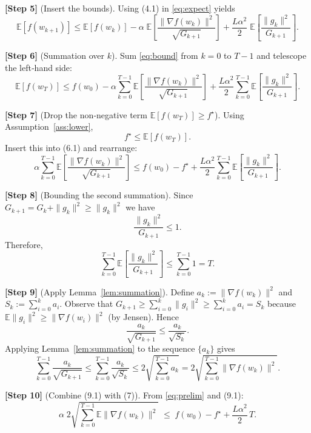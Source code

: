\documentclass{article}
\begin{document}
\noindent\textbf{[Step 5]} (Insert the bounds).  
Using (4.1) in \eqref{eq:expect} yields
\begin{equation}
\mathbb{E}[f(w_{k+1})]\le
\mathbb{E}[f(w_k)]-
\alpha\;\mathbb{E}\!\left[\frac{\|\nabla f(w_k)\|^{2}}{\sqrt{G_{k+1}}}\right]
+\frac{L\alpha^{2}}{2}\;
\mathbb{E}\!\left[\frac{\|g_k\|^{2}}{G_{k+1}}\right].
\label{eq:bound}
\end{equation}

\noindent\textbf{[Step 6]} (Summation over $k$).  
Sum \eqref{eq:bound} from $k=0$ to $T-1$ and telescope the left‑hand side:
\[
\mathbb{E}[f(w_T)]\le f(w_0)
-\alpha\sum_{k=0}^{T-1}\mathbb{E}\!\left[\frac{\|\nabla f(w_k)\|^{2}}{\sqrt{G_{k+1}}}\right]
+\frac{L\alpha^{2}}{2}\sum_{k=0}^{T-1}
\mathbb{E}\!\left[\frac{\|g_k\|^{2}}{G_{k+1}}\right].
\tag{6.1}
\]

\noindent\textbf{[Step 7]} (Drop the non‑negative term $\mathbb{E}[f(w_T)]\ge f^{\star}$).  
Using Assumption~\ref{ass:lower},
\[
f^{\star}\le\mathbb{E}[f(w_T)] .
\]
Insert this into (6.1) and rearrange:
\begin{equation}
\alpha\sum_{k=0}^{T-1}\mathbb{E}\!\left[\frac{\|\nabla f(w_k)\|^{2}}{\sqrt{G_{k+1}}}\right]
\le f(w_0)-f^{\star}
+\frac{L\alpha^{2}}{2}\sum_{k=0}^{T-1}
\mathbb{E}\!\left[\frac{\|g_k\|^{2}}{G_{k+1}}\right].
\label{eq:prelim}
\end{equation}

\noindent\textbf{[Step 8]} (Bounding the second summation).  
Since $G_{k+1}=G_k+\|g_k\|^{2}\ge \|g_k\|^{2}$ we have
\[
\frac{\|g_k\|^{2}}{G_{k+1}}\le 1 .
\]
Therefore,
\[
\sum_{k=0}^{T-1}\mathbb{E}\!\left[\frac{\|g_k\|^{2}}{G_{k+1}}\right]
\le \sum_{k=0}^{T-1}1 = T .
\tag{8.1}
\]

\noindent\textbf{[Step 9]} (Apply Lemma~\ref{lem:summation}).  
Define $a_k:=\|\nabla f(w_k)\|^{2}$ and $S_k:=\sum_{i=0}^{k} a_i$.
Observe that $G_{k+1}\ge \sum_{i=0}^{k}\|g_i\|^{2}\ge\sum_{i=0}^{k}a_i=S_k$ because $\mathbb{E}\|g_i\|^{2}\ge\|\nabla f(w_i)\|^{2}$ (by Jensen). Hence
\[
\frac{a_k}{\sqrt{G_{k+1}}}\le\frac{a_k}{\sqrt{S_k}} .
\]
Applying Lemma~\ref{lem:summation} to the sequence $\{a_k\}$ gives
\[
\sum_{k=0}^{T-1}\frac{a_k}{\sqrt{G_{k+1}}}
\le
\sum_{k=0}^{T-1}\frac{a_k}{\sqrt{S_k}}
\le 2\sqrt{\sum_{k=0}^{T-1}a_k}
=2\sqrt{\sum_{k=0}^{T-1}\|\nabla f(w_k)\|^{2}} .
\tag{9.1}
\]

\noindent\textbf{[Step 10]} (Combine (9.1) with (7)).  
From \eqref{eq:prelim} and (9.1):
\[
\alpha\;2\sqrt{\sum_{k=0}^{T-1}\mathbb{E}\|\nabla f(w_k)\|^{2}}
\;\le\;
f(w_0)-f^{\star}
+\frac{L\alpha^{2}}{2}\,T .
\]
\end{document}
